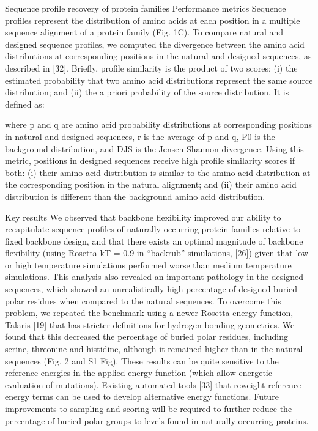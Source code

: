 Sequence profile recovery of protein families
Performance metrics
Sequence profiles represent the distribution of amino acids at each position in a multiple sequence alignment of a protein family (Fig. 1C). To compare natural and designed sequence profiles, we computed the divergence between the amino acid distributions at corresponding positions in the natural and designed sequences, as described in [32]. Briefly, profile similarity is the product of two scores: (i) the estimated probability that two amino acid distributions represent the same source distribution; and (ii) the a priori probability of the source distribution. It is defined as:



where p and q are amino acid probability distributions at corresponding positions in natural and designed sequences, r is the average of p and q, P0 is the background distribution, and DJS is the Jensen-Shannon divergence. Using this metric, positions in designed sequences receive high profile similarity scores if both: (i) their amino acid distribution is similar to the amino acid distribution at the corresponding position in the natural alignment; and (ii) their amino acid distribution is different than the background amino acid distribution.

Key results
We observed that backbone flexibility improved our ability to recapitulate sequence profiles of naturally occurring protein families relative to fixed backbone design, and that there exists an optimal magnitude of backbone flexibility (using Rosetta kT = 0.9 in “backrub” simulations, [26]) given that low or high temperature simulations performed worse than medium temperature simulations. This analysis also revealed an important pathology in the designed sequences, which showed an unrealistically high percentage of designed buried polar residues when compared to the natural sequences. To overcome this problem, we repeated the benchmark using a newer Rosetta energy function, Talaris [19] that has stricter definitions for hydrogen-bonding geometries. We found that this decreased the percentage of buried polar residues, including serine, threonine and histidine, although it remained higher than in the natural sequences (Fig. 2 and S1 Fig). These results can be quite sensitive to the reference energies in the applied energy function (which allow energetic evaluation of mutations). Existing automated tools [33] that reweight reference energy terms can be used to develop alternative energy functions. Future improvements to sampling and scoring will be required to further reduce the percentage of buried polar groups to levels found in naturally occurring proteins.

